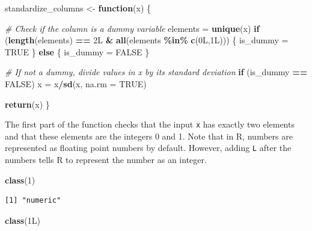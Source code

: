 \documentclass[
]{article}
\newenvironment{Shaded}{\begin{snugshade}}{\end{snugshade}}
\newcommand{\AttributeTok}[1]{\textcolor[rgb]{0.13,0.29,0.53}{#1}}
\newcommand{\CommentTok}[1]{\textcolor[rgb]{0.56,0.35,0.01}{\textit{#1}}}
\newcommand{\ConstantTok}[1]{\textcolor[rgb]{0.56,0.35,0.01}{#1}}
\newcommand{\ControlFlowTok}[1]{\textcolor[rgb]{0.13,0.29,0.53}{\textbf{#1}}}
\newcommand{\DataTypeTok}[1]{\textcolor[rgb]{0.13,0.29,0.53}{#1}}
\newcommand{\DecValTok}[1]{\textcolor[rgb]{0.00,0.00,0.81}{#1}}
\newcommand{\FunctionTok}[1]{\textcolor[rgb]{0.13,0.29,0.53}{\textbf{#1}}}
\newcommand{\NormalTok}[1]{#1}
\newcommand{\OtherTok}[1]{\textcolor[rgb]{0.56,0.35,0.01}{#1}}
\newcommand{\SpecialCharTok}[1]{\textcolor[rgb]{0.81,0.36,0.00}{\textbf{#1}}}
\begin{document}
\begin{Shaded}
\begin{Highlighting}[]
\NormalTok{standardize\_columns }\OtherTok{\textless{}{-}} \ControlFlowTok{function}\NormalTok{(x) \{}
   
   \CommentTok{\# Check if the column is a dummy variable}
\NormalTok{   elements }\OtherTok{=} \FunctionTok{unique}\NormalTok{(x)}
   \ControlFlowTok{if}\NormalTok{ (}\FunctionTok{length}\NormalTok{(elements) }\SpecialCharTok{==} \DecValTok{2}\DataTypeTok{L} \SpecialCharTok{\&} \FunctionTok{all}\NormalTok{(elements }\SpecialCharTok{\%in\%} \FunctionTok{c}\NormalTok{(}\DecValTok{0}\DataTypeTok{L}\NormalTok{,}\DecValTok{1}\DataTypeTok{L}\NormalTok{))) \{}
\NormalTok{      is\_dummy }\OtherTok{=} \ConstantTok{TRUE}
\NormalTok{   \} }\ControlFlowTok{else}\NormalTok{ \{}
\NormalTok{      is\_dummy }\OtherTok{=} \ConstantTok{FALSE}
\NormalTok{   \}}
   
   \CommentTok{\# If not a dummy, divide values in x by its standard deviation}
   \ControlFlowTok{if}\NormalTok{ (is\_dummy }\SpecialCharTok{==} \ConstantTok{FALSE}\NormalTok{) x }\OtherTok{=}\NormalTok{ x}\SpecialCharTok{/}\FunctionTok{sd}\NormalTok{(x, }\AttributeTok{na.rm =} \ConstantTok{TRUE}\NormalTok{)}
   
   \FunctionTok{return}\NormalTok{(x)}
\NormalTok{\}}
\end{Highlighting}
\end{Shaded}

The first part of the function checks that the input \texttt{x} has
exactly two elements and that these elements are the integers 0 and 1.
Note that in R, numbers are represented as floating point numbers by
default. However, adding \texttt{L} after the numbers tells R to
represent the number as an integer.

\begin{Shaded}
\begin{Highlighting}[]
\FunctionTok{class}\NormalTok{(}\DecValTok{1}\NormalTok{)}
\end{Highlighting}
\end{Shaded}

\begin{verbatim}
[1] "numeric"
\end{verbatim}

\begin{Shaded}
\begin{Highlighting}[]
\FunctionTok{class}\NormalTok{(}\DecValTok{1}\DataTypeTok{L}\NormalTok{)}
\end{Highlighting}
\end{Shaded}
\end{document}
